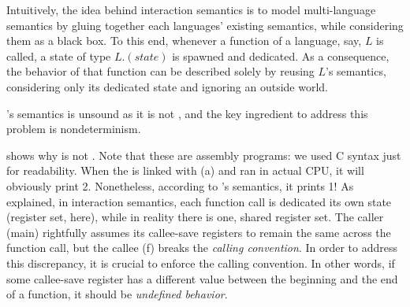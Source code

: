 {
Intuitively, the idea behind interaction semantics is to model multi-language semantics by gluing together each languages’ existing semantics, while considering them as a black box.
To this end, whenever a function of a language, say, $L$ is called, a state of type $L.(state)$ is spawned and dedicated.
As a consequence, the behavior of that function can be described solely by reusing $L$'s semantics, considering only its dedicated state and ignoring an outside world.





\ccc{}'s semantics is unsound as it is not \lbound{}, and the key ingredient to address this problem is nondeterminism.

 shows why \ccc{} is not \lbound{}.
Note that these are assembly programs: we used C syntax just for readability.
When the  is linked with (a) and ran in actual CPU, it will obviously print 2.
Nonetheless, according to \ccc{}'s semantics, it prints 1!
As explained, in interaction semantics, each function call is dedicated its own state (register set, here), while in reality there is one, shared register set.
The caller (main) rightfully assumes its callee-save registers to remain the same across the function call, but the callee (f) breaks the \textit{calling convention}.
In order to address this discrepancy, it is crucial to enforce the calling convention. %
In other words, if some callee-save register has a different value between the beginning and the end of a function, it should be \textit{undefined behavior}.

}
